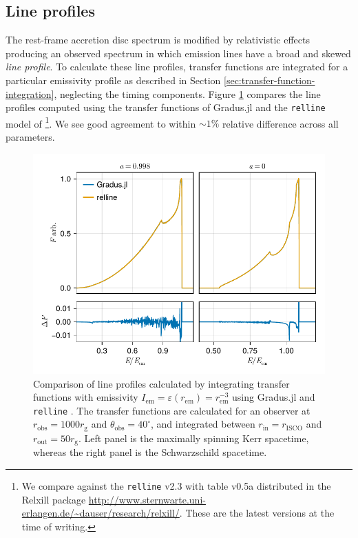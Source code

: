 \documentclass[fleqn,usenatbib]{mnras}
\newcommand{\Gradus}{{\sc Gradus.jl}\xspace}
\newcommand{\relline}{\texttt{relline} }
\newcommand{\rg}{r_\text{g}}
\newcommand{\risco}{r_\text{ISCO}}
\newcommand{\rhoem}{r_\text{em}}
\begin{document}
\subsection{Line profiles}

The rest-frame accretion disc spectrum is modified by relativistic effects
producing an observed spectrum in which emission lines have a broad and skewed
\emph{line profile}.  To calculate these line profiles, transfer functions are
integrated for a particular emissivity profile as described in Section
\ref{sec:transfer-function-integration}, neglecting the timing components.
Figure \ref{fig:relline-comparison} compares the line profiles computed using
the transfer functions of \Gradus and the \relline model of
\cite{dauser_broad_2010}\footnote{We compare against the \relline v2.3 with
    table v0.5a distributed in the Relxill package
\url{http://www.sternwarte.uni-erlangen.de/~dauser/research/relxill/}. These
are the latest versions at the time of writing.}. We see good agreement to
within $\sim 1\%$ relative difference across all parameters.

\begin{figure}
    \centering
    \includegraphics[width=0.99\columnwidth]{figures/lineprofiles.comparison.pdf}
    \caption{Comparison of line profiles calculated by integrating transfer
        functions with emissivity $I_\text{em} = \varepsilon(\rhoem) =
        \rhoem^{-3}$ using \Gradus and \relline. The transfer functions are
        calculated for an observer at $r_\text{obs} = 1000\rg$ and
        $\theta_\text{obs} = 40^\circ$, and integrated between $r_\text{in} =
        \risco$ and $r_\text{out} = 50 \rg$. Left panel is the maximally
        spinning Kerr spacetime, whereas the right panel is the Schwarzschild
        spacetime.}
    \label{fig:relline-comparison}
\end{figure}
\end{document}
